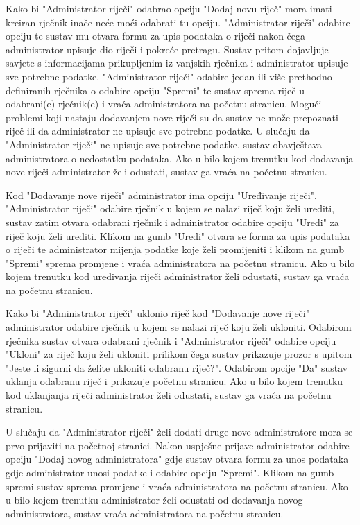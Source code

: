 Kako bi "Administrator riječi" odabrao opciju "Dodaj novu riječ" mora imati kreiran rječnik inače neće moći odabrati tu opciju. "Administrator riječi" odabire opciju te sustav mu otvara formu za upis podataka o riječi nakon čega administrator upisuje dio riječi i pokreće pretragu. Sustav pritom dojavljuje savjete s informacijama prikupljenim iz vanjskih rječnika i administrator upisuje sve potrebne podatke. "Administrator riječi" odabire jedan ili više prethodno definiranih rječnika o odabire opciju "Spremi" te sustav sprema riječ u odabrani(e) rječnik(e) i vraća administratora na početnu stranicu. Mogući problemi koji nastaju dodavanjem nove riječi su da sustav ne može prepoznati riječ ili da administrator ne upisuje sve potrebne podatke. U slučaju  da "Administrator riječi" ne upisuje sve potrebne podatke, sustav obavještava administratora o nedostatku podataka.
Ako u bilo kojem trenutku kod dodavanja nove riječi administrator želi odustati, sustav ga vraća na početnu stranicu.

Kod "Dodavanje nove riječi" administrator ima opciju "Uređivanje riječi". "Administrator riječi" odabire rječnik u kojem se nalazi riječ koju želi urediti, sustav zatim otvara odabrani rječnik i administrator odabire opciju "Uredi" za riječ koju želi urediti. Klikom na gumb "Uredi" otvara se forma za upis podataka o riječi te administrator mijenja podatke koje želi promijeniti i klikom na gumb "Spremi" sprema promjene i vraća administratora na početnu stranicu. Ako u bilo kojem trenutku kod uređivanja riječi administrator želi odustati, sustav ga vraća na početnu stranicu.

Kako bi "Administrator riječi" uklonio riječ kod "Dodavanje nove riječi" administrator odabire rječnik u kojem se nalazi riječ koju želi ukloniti. Odabirom rječnika sustav otvara odabrani rječnik
i "Administrator riječi" odabire opciju "Ukloni" za riječ koju želi ukloniti prilikom čega sustav prikazuje prozor s upitom "Jeste li sigurni da želite ukloniti odabranu riječ?". Odabirom opcije "Da" sustav uklanja odabranu riječ i prikazuje početnu stranicu. Ako u bilo kojem trenutku kod uklanjanja riječi administrator želi odustati, sustav ga vraća na početnu stranicu.

U slučaju da "Administrator riječi" želi dodati druge nove administratore mora se prvo prijaviti na početnoj stranici. Nakon uspješne prijave administrator odabire opciju "Dodaj novog administratora"
gdje sustav otvara formu za unos podataka gdje administrator unosi podatke i odabire opciju "Spremi". Klikom na gumb spremi sustav sprema promjene i vraća administratora na početnu stranicu. 
Ako u bilo kojem trenutku administrator želi odustati od dodavanja novog administratora, sustav vraća administratora na početnu stranicu.

